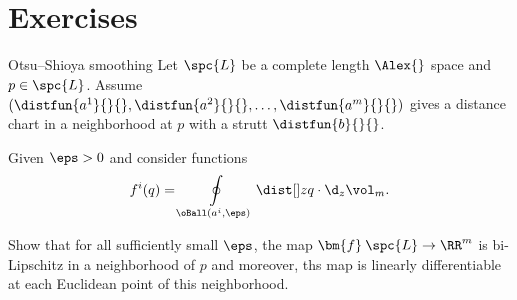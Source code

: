 \section{Exercises}

\begin{thm}{Otsu--Shioya smoothing}
Let $\spc{L}$ be a complete length $\Alex{}$ space and $p\in\spc{L}$.
Assume $(\distfun{a^1}{}{},\distfun{a^2}{}{},\dots,\distfun{a^m}{}{})$
gives a distance chart 
in a neighborhood at $p$ with a strutt $\distfun{b}{}{}$.

Given $\eps>0$ and consider functions 
\[f^i(q)=\oint\limits_{\oBall(a^i,\eps)}\dist[{{}}]{z}{q}{}\cdot\d_z\vol_m.\]

Show that for all sufficiently small $\eps$,
the map $\bm{f}\:\spc{L}\to\RR^m$ is bi-Lipschitz in a neighborhood of $p$ and moreover, ths map is linearly differentiable at each Euclidean point of this neighborhood.
\end{thm}










